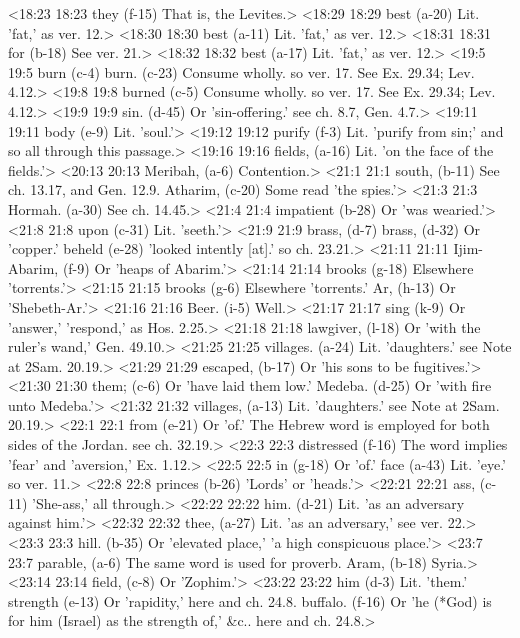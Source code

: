 <18:23 18:23  they (f-15)  That is, the Levites.>
<18:29 18:29  best (a-20) Lit. 'fat,' as ver. 12.>
<18:30 18:30  best (a-11) Lit. 'fat,' as ver. 12.>
<18:31 18:31  for (b-18)  See ver. 21.>
<18:32 18:32  best (a-17)  Lit. 'fat,' as ver. 12.>
<19:5 19:5  burn (c-4)  burn. (c-23)
  Consume wholly. so ver. 17. See Ex. 29.34; Lev. 4.12.>
<19:8 19:8  burned (c-5)  Consume wholly. so ver. 17. See Ex. 29.34; Lev. 4.12.>
<19:9 19:9  sin. (d-45)  Or 'sin-offering.' see ch. 8.7, Gen. 4.7.>
<19:11 19:11  body (e-9)  Lit. 'soul.'>
<19:12 19:12  purify (f-3)  Lit. 'purify from sin;' and so all through this passage.>
<19:16 19:16  fields, (a-16)  Lit. 'on the face of the fields.'>
<20:13 20:13  Meribah, (a-6)  Contention.>
<21:1 21:1  south, (b-11)  See ch. 13.17, and Gen. 12.9.
  Atharim, (c-20)  Some read 'the spies.'>
<21:3 21:3  Hormah. (a-30)  See ch. 14.45.>
<21:4 21:4  impatient (b-28)  Or 'was wearied.'>
<21:8 21:8  upon (c-31)  Lit. 'seeth.'>
<21:9 21:9  brass, (d-7)  brass, (d-32)  Or 'copper.'
  beheld (e-28)  'looked intently [at].' so ch. 23.21.>
<21:11 21:11  Ijim-Abarim, (f-9)  Or 'heaps of Abarim.'>
<21:14 21:14  brooks (g-18) Elsewhere 'torrents.'>
<21:15 21:15  brooks (g-6)  Elsewhere 'torrents.'
  Ar, (h-13)  Or 'Shebeth-Ar.'>
<21:16 21:16  Beer. (i-5)  Well.>
<21:17 21:17  sing (k-9)  Or 'answer,' 'respond,' as Hos. 2.25.>
<21:18 21:18  lawgiver, (l-18)  Or 'with the ruler's wand,' Gen. 49.10.>
<21:25 21:25  villages. (a-24) Lit. 'daughters.' see Note at 2Sam. 20.19.>
<21:29 21:29  escaped, (b-17)  Or 'his sons to be fugitives.'>
<21:30 21:30  them; (c-6)  Or 'have laid them low.'
  Medeba. (d-25)  Or 'with fire unto Medeba.'>
<21:32 21:32  villages, (a-13)  Lit. 'daughters.' see Note at 2Sam. 20.19.>
<22:1 22:1  from (e-21)  Or 'of.' The Hebrew word is employed for both sides of the  Jordan. see ch. 32.19.>
<22:3 22:3  distressed (f-16)  The word implies 'fear' and 'aversion,' Ex. 1.12.>
<22:5 22:5  in (g-18)  Or 'of.'
  face (a-43)  Lit. 'eye.' so ver. 11.>
<22:8 22:8  princes (b-26)  'Lords' or 'heads.'>
<22:21 22:21  ass, (c-11)  'She-ass,' all through.>
<22:22 22:22  him. (d-21)  Lit. 'as an adversary against him.'>
<22:32 22:32  thee, (a-27)  Lit. 'as an adversary,' see ver. 22.>
<23:3 23:3  hill. (b-35)  Or 'elevated place,' 'a high conspicuous place.'>
<23:7 23:7  parable, (a-6)  The same word is used for proverb.
  Aram, (b-18)  Syria.>
<23:14 23:14  field, (c-8)  Or 'Zophim.'>
<23:22 23:22  him (d-3)  Lit. 'them.'
  strength (e-13)  Or 'rapidity,' here and ch. 24.8.
  buffalo. (f-16)  Or 'he (*God) is for him (Israel) as the strength of,' &c..  here and ch. 24.8.>
